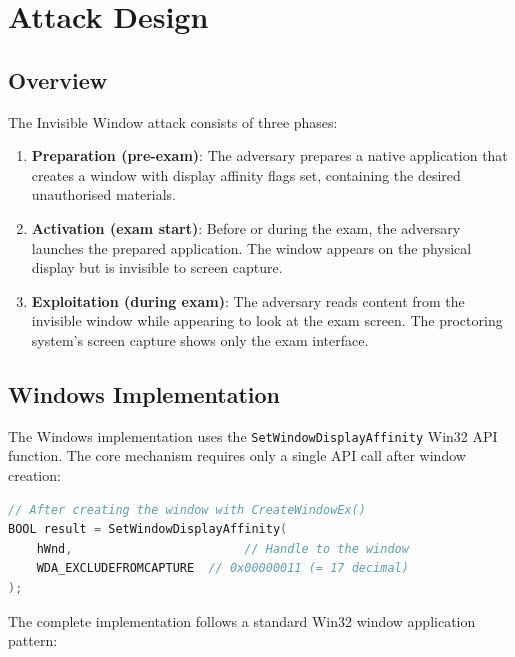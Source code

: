 \documentclass[conference]{IEEEtran}
\begin{document}
\section{Attack Design}

\subsection{Overview}

The Invisible Window attack consists of three phases:

\begin{enumerate}
\item \textbf{Preparation (pre-exam)}: The adversary prepares a native application that creates a window with display affinity flags set, containing the desired unauthorised materials.

\item \textbf{Activation (exam start)}: Before or during the exam, the adversary launches the prepared application. The window appears on the physical display but is invisible to screen capture.

\item \textbf{Exploitation (during exam)}: The adversary reads content from the invisible window while appearing to look at the exam screen. The proctoring system's screen capture shows only the exam interface.
\end{enumerate}

\subsection{Windows Implementation}

The Windows implementation uses the \texttt{SetWindowDisplayAffinity} Win32 API function. The core mechanism requires only a single API call after window creation:

\begin{lstlisting}[language=C,caption={Windows display affinity exclusion via \texttt{SetWindowDisplayAffinity}.},label={lst:windows}]
// After creating the window with CreateWindowEx()
BOOL result = SetWindowDisplayAffinity(
    hWnd,                        // Handle to the window
    WDA_EXCLUDEFROMCAPTURE  // 0x00000011 (= 17 decimal)
);
\end{lstlisting}

The complete implementation follows a standard Win32 window application pattern:
\end{document}
